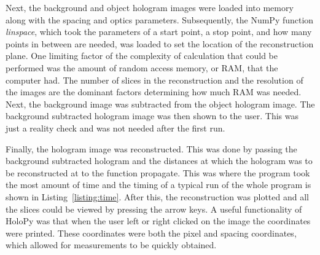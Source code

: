 

Next, the background and object hologram images were
loaded into memory along with the spacing and optics parameters. 
Subsequently, the NumPy
function \emph{linspace}, which took the parameters of a start point, a stop
point, and how many points in between are needed, was loaded to set the
location of the reconstruction plane.
One limiting factor of the complexity of calculation that could be performed
was the amount of random access
memory, or RAM, that the computer had. The number of slices in the
reconstruction and the resolution of the images are the dominant factors
determining how much RAM was needed.
Next, the background image was
subtracted from the object hologram image.
%
%
The background subtracted hologram image was then shown to the user. 
This was
just a reality check and was not needed after the first run.


Finally, the hologram image was
reconstructed. This was done by passing the background subtracted hologram and
the distances at which the hologram was to be reconstructed at to the function
propagate. This was where the program took the most amount of time and the timing
of a typical run of the whole program is shown in Listing~\ref{listing:time}. After this,
the reconstruction was plotted and all the slices could be viewed by pressing the
arrow keys. A useful functionality of HoloPy was that when the user left or right
clicked on the image the coordinates were printed. These coordinates were both
the pixel and spacing coordinates, which allowed for measurements to be quickly
obtained.



